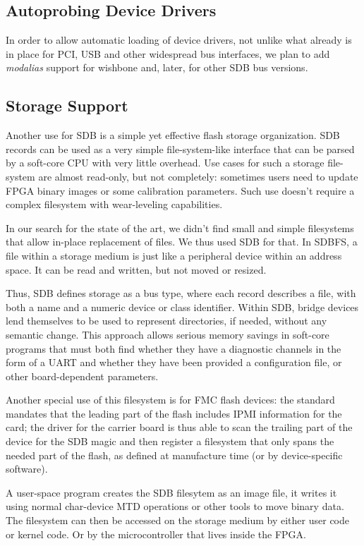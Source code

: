 \documentclass[a4paper, 12pt]{article}
\begin{document}
\subsection{Autoprobing Device Drivers}

In order to allow automatic loading of device drivers, not unlike
what already is in place for PCI, USB and other widespread bus
interfaces, we plan to add \textit{modalias} support for wishbone
and, later, for other SDB bus versions.

\subsection{Storage Support}

Another use for SDB is a simple yet
effective flash storage organization.  SDB records can be used as a
very simple file-system-like interface that can be parsed by a
soft-core CPU with very little overhead.
Use cases for such a storage file-system are almost read-only, but not completely:
sometimes users need to update FPGA binary images or some
calibration parameters.  Such use doesn't require a complex
filesystem with wear-leveling capabilities.

In our search for the state of the art, we didn't find small and
simple filesystems that allow in-place replacement of files.  We thus
used SDB for that.  In SDBFS, a file within a storage medium is just
like a peripheral device within an address space.  It can be
read and written, but not moved or resized.

Thus, SDB defines storage as a bus type, where each
record describes a file, with both a name and a numeric device
or class identifier.  Within SDB, bridge devices lend themselves to be
used to represent directories, if needed, without any semantic change.
This approach allows serious memory savings in soft-core programs that
must both find whether they have a diagnostic channels in the form of
a UART and whether they have been provided a configuration file, or
other board-dependent parameters.

Another special use of this filesystem is for FMC flash devices: the
standard mandates that the leading part of the flash includes IPMI
information for the card; the driver for the carrier board is thus
able to scan the trailing part of the device for the SDB magic and
then register a filesystem that only spans the needed part of the
flash, as defined at manufacture time (or by device-specific
software).

A user-space program creates the SDB filesytem as an image file, it
writes it using normal char-device MTD operations or other tools
to move binary data.  The filesystem can then be accessed on the storage
medium by either user code or kernel code. Or by the microcontroller
that lives inside the FPGA.
\end{document}
